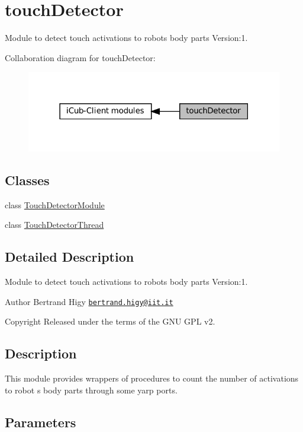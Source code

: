 \hypertarget{group__touchDetector}{}\section{touch\+Detector}
\label{group__touchDetector}


Module to detect touch activations to robot\textquotesingle{}s body parts Version\+:1.  


Collaboration diagram for touch\+Detector\+:
\nopagebreak
\begin{figure}[H]
\begin{center}
\leavevmode
\includegraphics[width=318pt]{group__touchDetector}
\end{center}
\end{figure}
\subsection*{Classes}
\begin{DoxyCompactItemize}
\item 
class \hyperlink{group__touchDetector_classTouchDetectorModule}{Touch\+Detector\+Module}
\item 
class \hyperlink{group__touchDetector_classTouchDetectorThread}{Touch\+Detector\+Thread}
\end{DoxyCompactItemize}


\subsection{Detailed Description}
Module to detect touch activations to robot\textquotesingle{}s body parts Version\+:1. 

\begin{DoxyAuthor}{Author}
Bertrand Higy \href{mailto:bertrand.higy@iit.it}{\tt bertrand.\+higy@iit.\+it} ~\newline
 
\end{DoxyAuthor}
\begin{DoxyCopyright}{Copyright}
Released under the terms of the G\+NU G\+PL v2. 
\end{DoxyCopyright}
\hypertarget{group__touchDetector_intro_sec}{}\subsection{Description}\label{group__touchDetector_intro_sec}
This module provides wrappers of procedures to count the number of activations to robot \textquotesingle{}s body parts through some yarp ports.\hypertarget{group__touchDetector_parameters_sec}{}\subsection{Parameters}\label{group__touchDetector_parameters_sec}

